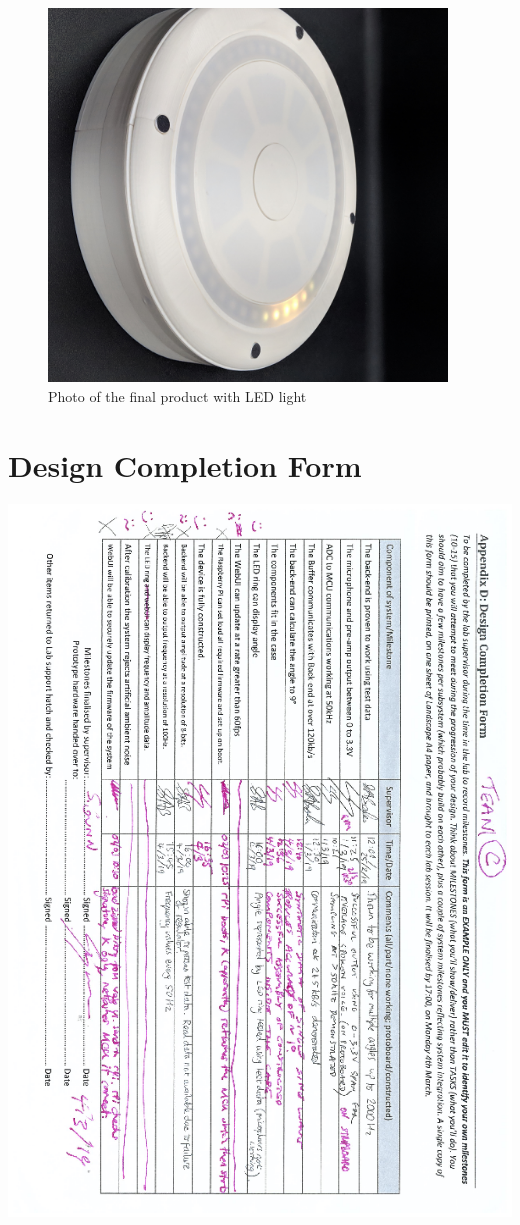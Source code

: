 \documentclass[a4paper]{article}
\begin{document}
\begin{figure}[H]
\begin{center}
\includegraphics[width=300pt]{pictures/FinalProduct-cropped.jpg}
\caption{Photo of the final product with LED light}
\label{fig:finprod}
\end{center}
\end{figure}


\appendix
\section{Design Completion Form}
\includegraphics[width=500pt]{appendixA/DesignCompletionForm-complete.png}
\end{document}
